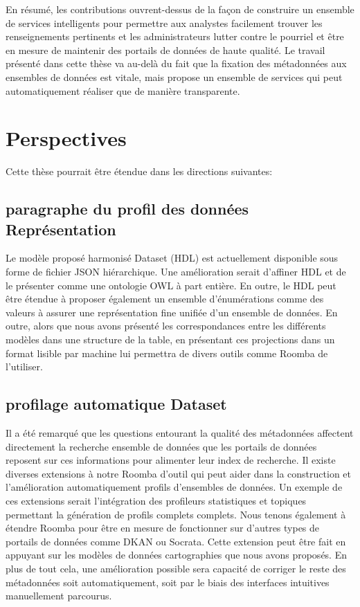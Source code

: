 \documentclass[a4paper,11pt,twoside]{ThesisStyle}
\begin{document}
En résumé, les contributions ouvrent-dessus de la façon de construire un ensemble de services intelligents pour permettre aux analystes facilement trouver les renseignements pertinents et les administrateurs lutter contre le pourriel et être en mesure de maintenir des portails de données de haute qualité. Le travail présenté dans cette thèse va au-delà du fait que la fixation des métadonnées aux ensembles de données est vitale, mais propose un ensemble de services qui peut automatiquement réaliser que de manière transparente.

\section{Perspectives}

Cette thèse pourrait être étendue dans les directions suivantes:

\subsection{paragraphe du profil des données Représentation}
Le modèle proposé harmonisé Dataset (HDL) est actuellement disponible sous forme de fichier JSON hiérarchique. Une amélioration serait d'affiner HDL et de le présenter comme une ontologie OWL à part entière. En outre, le HDL peut être étendue à proposer également un ensemble d'énumérations comme des valeurs à assurer une représentation fine unifiée d'un ensemble de données. En outre, alors que nous avons présenté les correspondances entre les différents modèles dans une structure de la table, en présentant ces projections dans un format lisible par machine lui permettra de divers outils comme Roomba de l'utiliser.

\subsection{profilage automatique Dataset}
Il a été remarqué que les questions entourant la qualité des métadonnées affectent directement la recherche ensemble de données que les portails de données reposent sur ces informations pour alimenter leur index de recherche. Il existe diverses extensions à notre Roomba d'outil qui peut aider dans la construction et l'amélioration automatiquement profils d'ensembles de données. Un exemple de ces extensions serait l'intégration des profileurs statistiques et topiques permettant la génération de profils complets complets. Nous tenons également à étendre Roomba pour être en mesure de fonctionner sur d'autres types de portails de données comme DKAN ou Socrata. Cette extension peut être fait en appuyant sur les modèles de données cartographies que nous avons proposés. En plus de tout cela, une amélioration possible sera capacité de corriger le reste des métadonnées soit automatiquement, soit par le biais des interfaces intuitives manuellement parcourus.
\end{document}
